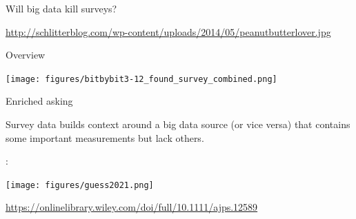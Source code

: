 \documentclass[aspectratio=169]{beamer}
\begin{document}
\begin{frame}

\begin{center}
\LARGE{Will big data kill surveys?}
\end{center}

\end{frame}
\begin{frame}

\begin{center}
\end{center}

\vfill
\tiny{\url{http://schlitterblog.com/wp-content/uploads/2014/05/peanutbutterlover.jpg}}

\end{frame}
\begin{frame}{Overview}

\begin{center}
\texttt{[image: figures/bitbybit3-12\_found\_survey\_combined.png]}
\end{center}

\end{frame}
\begin{frame}

\begin{center}
\LARGE{Enriched asking} \\
\end{center}
Survey data builds context around a big data source (or vice versa) that contains some important measurements but lack others. 

\textbf{}: 

\end{frame}
\begin{frame}

\begin{center}
\texttt{[image: figures/guess2021.png]}
\end{center}

\vfill
\tiny{\url{https://onlinelibrary.wiley.com/doi/full/10.1111/ajps.12589}}

\end{frame}
\end{document}
